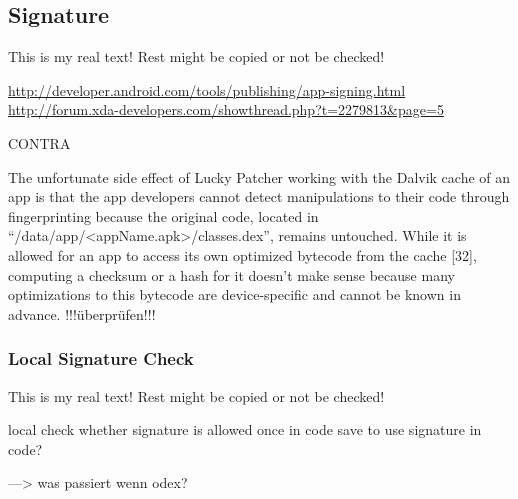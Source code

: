 \subsection{Signature} \label{subsection:counter-tampering-signature}

This is my real text! Rest might be copied or not be checked!


\url{http://developer.android.com/tools/publishing/app-signing.html}\newline
\url{http://forum.xda-developers.com/showthread.php?t=2279813&page=5}\newline

CONTRA\newline


The unfortunate side effect of Lucky Patcher working with the Dalvik cache of an app is that the app developers cannot detect manipulations to their code through fingerprinting because the original code, located in “/data/app/<appName.apk>/classes.dex”, remains untouched. While it is allowed for an app to access its own optimized bytecode from the cache [32], computing a checksum or a hash for it doesn’t make sense because many optimizations to this bytecode are device-specific and cannot be known in advance.
\cite{munteanLicense}
!!!überprüfen!!!


\subsubsection{Local Signature Check} \label{subsubsection:counter-tampering-signature-local}
This is my real text! Rest might be copied or not be checked!



local check whether signature is allowed\newline
once in code \newline
save to use signature in code?\newline



---> was passiert wenn odex?
